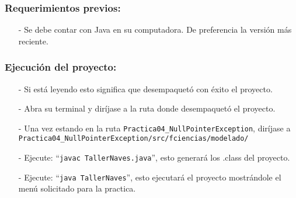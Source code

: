\documentclass{article}
\newcommand{\code}[1]{\textcolor{white!25!black}{\texttt{#1}}}
\begin{document}
\subsubsection*{Requerimientos previos:}
\begin{itemize}
\item[-] Se debe contar con Java en su computadora. De preferencia la versión más reciente.
\end{itemize}

\subsubsection*{Ejecución del proyecto:}
\begin{itemize}
\item[-] Si está leyendo esto significa que desempaquetó con éxito el proyecto.
\item[-] Abra su terminal y diríjase a la ruta donde desempaquetó el proyecto.
\item[-] Una vez estando en la ruta \code{Practica04\_NullPointerException}, diríjase a
  \code{Practica04\_NullPointerException/src/fciencias/modelado/}
\item[-] Ejecute: “\code{javac TallerNaves.java}”, esto generará los .class del proyecto.
\item[-] Ejecute: “\code{java TallerNaves}”, esto ejecutará el proyecto mostrándole el menú solicitado para la practica.

\end{itemize}
\end{document}
